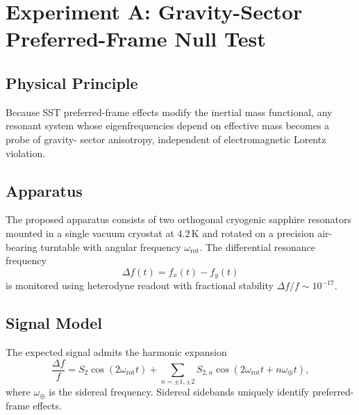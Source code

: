 \documentclass[11pt]{article}
\begin{document}
    \section{Experiment A: Gravity-Sector Preferred-Frame Null Test}

        \subsection{Physical Principle}

            Because SST preferred-frame effects modify the inertial mass functional, any resonant
            system whose eigenfrequencies depend on effective mass becomes a probe of gravity-
            sector anisotropy, independent of electromagnetic Lorentz violation.

        \subsection{Apparatus}

            The proposed apparatus consists of two orthogonal cryogenic sapphire resonators
            mounted in a single vacuum cryostat at $4.2\,\mathrm{K}$ and rotated on a precision
            air-bearing turntable with angular frequency $\omega_{\mathrm{rot}}$.
            The differential resonance frequency
            \begin{equation}
                \Delta f(t) = f_x(t) - f_y(t)
            \end{equation}
            is monitored using heterodyne readout with fractional stability
            $\Delta f/f \sim 10^{-17}$.

        \subsection{Signal Model}

            The expected signal admits the harmonic expansion
            \begin{equation}
                \frac{\Delta f}{f}
                =
                S_2 \cos(2\omega_{\mathrm{rot}} t)
                + \sum_{n=\pm1,\pm2}
                S_{2,n}\cos(2\omega_{\mathrm{rot}} t + n\omega_\oplus t),
            \end{equation}
            where $\omega_\oplus$ is the sidereal frequency.
            Sidereal sidebands uniquely identify preferred-frame effects.
\end{document}
